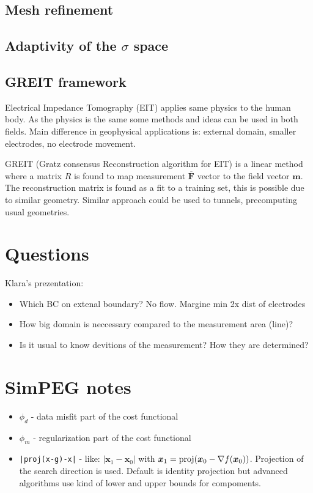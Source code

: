 \documentclass[a4paper, 12pt]{book}
\theoremstyle{definition}
\def\grad{\nabla}
\def\vc#1{\mathbf{\boldsymbol{#1}}}     %
\begin{document}
\subsection{Mesh refinement}

\subsection{Adaptivity of the $\sigma$ space}

\subsection{GREIT framework}
Electrical Impedance Tomography (EIT) applies same physics to the human body. As the physics is the same
some methods and ideas can be used in both fields. Main difference in geophysical applications is:
external domain, smaller electrodes, no electrode movement.

GREIT (Gratz consensus Reconstruction algorithm for EIT) is a linear method where a matrix $R$ is found to map measurement
$\overline{\vc F}$ vector to the field vector $\vc m$. The reconstruction matrix is found as a fit to a training set, this is possible
due to similar geometry. Similar approach could be used to tunnels, precomputing usual geometries.


\section{Questions}
Klara's prezentation:
\begin{itemize}
 \item Which BC on extenal boundary? No flow. Margine min 2x dist of electrodes
 \item How big domain is neccessary compared to the measurement area (line)?
 \item Is it usual to know devitions of the measurement? How they are determined?
\end{itemize}


\section{SimPEG notes}
\begin{itemize}
    \item $\phi_d$ - data misfit part of the cost functional
    \item $\phi_m$ - regularization part of the cost functional
    \item \verb'|proj(x-g)-x|' - like: $|\vc x_1 - \vc x_0|$ with $\vc x_1 = {\rm proj}(\vc x_0 - \grad f(\vc x_0))$.
    Projection of the search direction is used. Default is identity  projection but advanced algorithms use kind of lower
    and upper bounds for compoments.
\end{itemize}



\end{document}
